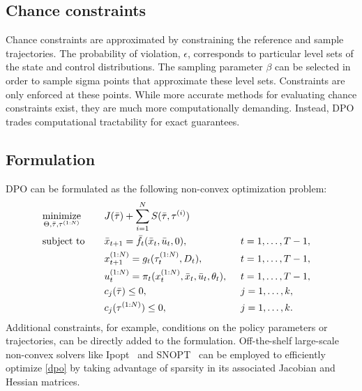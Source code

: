 \subsection{Chance constraints}
Chance constraints are approximated by constraining the reference and sample trajectories. The probability of violation, $\epsilon$, corresponds to particular level sets of the state and control distributions. The sampling parameter $\beta$ can be selected in order to sample sigma points that approximate these level sets. Constraints are only enforced at these points. While more accurate methods for evaluating chance constraints exist, they are much more computationally demanding. Instead, DPO trades computational tractability for exact guarantees.

\subsection{Formulation}
DPO can be formulated as the following non-convex optimization problem: 
\begin{alignat}{3}
	&\underset{\Theta, \bar{\tau}, \tau^{(1:N)}}{\mbox{minimize}} && \quad J(\bar{\tau}) + \sum \limits_{i=1}^{N} S(\bar{\tau}, \tau^{(i)}) \label{dpo}\\
	&\mbox{subject to} &&\quad \bar{x}_{t+1} = \bar{f}_t(\bar{x}_t,\bar{u}_t,0),&&\hspace{0.5em} t = 1,\dots,T-1, \notag\\
	&&&\quad x_{t+1}^{(1:N)} = g_t(\tau_t^{(1:N)}, D_t),&&\hspace{0.5em} t = 1,\dots,T-1,\notag \\
	&&&\quad u^{(1:N)}_t = \pi_t(x^{(1:N)}_t,\bar{x}_t,\bar{u}_t,\theta_t),&&\hspace{0.5em} t = 1,\dots,T-1,\notag\\
	&&&\quad c_j(\bar{\tau}) \leq 0,&&\hspace{0.5em} j = 1,\dots,k,\notag\\
	&&&\quad c_j(\tau^{(1:N)}) \leq 0,&&\hspace{0.5em} j = 1,\dots,k.\notag
\end{alignat}
Additional constraints, for example, conditions on the policy parameters or trajectories, can be directly added to the formulation. Off-the-shelf large-scale non-convex solvers like Ipopt~\cite{wachter2006implementation} and SNOPT~\cite{gill2005snopt} can be employed to efficiently optimize \eqref{dpo} by taking advantage of sparsity in its associated Jacobian and Hessian matrices.

